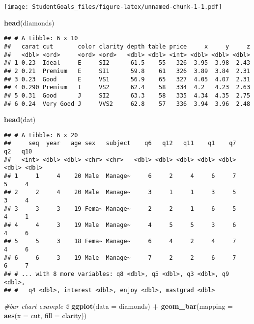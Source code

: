 \documentclass[]{article}
\newenvironment{Shaded}{\begin{snugshade}}{\end{snugshade}}
\newcommand{\CommentTok}[1]{\textcolor[rgb]{0.56,0.35,0.01}{\textit{#1}}}
\newcommand{\DataTypeTok}[1]{\textcolor[rgb]{0.13,0.29,0.53}{#1}}
\newcommand{\KeywordTok}[1]{\textcolor[rgb]{0.13,0.29,0.53}{\textbf{#1}}}
\newcommand{\NormalTok}[1]{#1}
\newcommand{\OperatorTok}[1]{\textcolor[rgb]{0.81,0.36,0.00}{\textbf{#1}}}
\newcommand{\StringTok}[1]{\textcolor[rgb]{0.31,0.60,0.02}{#1}}
\begin{document}
\texttt{[image: StudentGoals\_files/figure-latex/unnamed-chunk-1-1.pdf]}

\begin{Shaded}
\begin{Highlighting}[]
\KeywordTok{head}\NormalTok{(diamonds)}
\end{Highlighting}
\end{Shaded}

\begin{verbatim}
## # A tibble: 6 x 10
##   carat cut       color clarity depth table price     x     y     z
##   <dbl> <ord>     <ord> <ord>   <dbl> <dbl> <int> <dbl> <dbl> <dbl>
## 1 0.23  Ideal     E     SI2      61.5    55   326  3.95  3.98  2.43
## 2 0.21  Premium   E     SI1      59.8    61   326  3.89  3.84  2.31
## 3 0.23  Good      E     VS1      56.9    65   327  4.05  4.07  2.31
## 4 0.290 Premium   I     VS2      62.4    58   334  4.2   4.23  2.63
## 5 0.31  Good      J     SI2      63.3    58   335  4.34  4.35  2.75
## 6 0.24  Very Good J     VVS2     62.8    57   336  3.94  3.96  2.48
\end{verbatim}

\begin{Shaded}
\begin{Highlighting}[]
\KeywordTok{head}\NormalTok{(dat)}
\end{Highlighting}
\end{Shaded}

\begin{verbatim}
## # A tibble: 6 x 20
##     seq  year   age sex   subject    q6   q12   q11    q1    q7    q2   q10
##   <int> <dbl> <dbl> <chr> <chr>   <dbl> <dbl> <dbl> <dbl> <dbl> <dbl> <dbl>
## 1     1     4    20 Male  Manage~     6     2     4     6     7     5     4
## 2     2     4    20 Male  Manage~     3     1     1     3     5     3     4
## 3     3     3    19 Fema~ Manage~     2     2     1     6     5     4     1
## 4     4     3    19 Male  Manage~     4     5     5     3     6     4     6
## 5     5     3    18 Fema~ Manage~     6     4     2     4     7     4     6
## 6     6     3    19 Male  Manage~     7     2     2     6     7     6     7
## # ... with 8 more variables: q8 <dbl>, q5 <dbl>, q3 <dbl>, q9 <dbl>,
## #   q4 <dbl>, interest <dbl>, enjoy <dbl>, mastgrad <dbl>
\end{verbatim}

\begin{Shaded}
\begin{Highlighting}[]
\CommentTok{#bar chart example 2}
\KeywordTok{ggplot}\NormalTok{(}\DataTypeTok{data =}\NormalTok{ diamonds) }\OperatorTok{+}\StringTok{ }
\StringTok{  }\KeywordTok{geom_bar}\NormalTok{(}\DataTypeTok{mapping =} \KeywordTok{aes}\NormalTok{(}\DataTypeTok{x =}\NormalTok{ cut, }\DataTypeTok{fill =}\NormalTok{ clarity))}
\end{Highlighting}
\end{Shaded}
\end{document}
